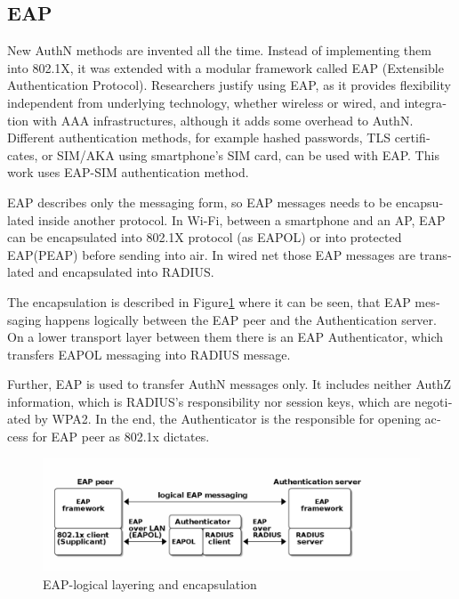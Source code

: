 \documentclass[12pt,a4paper,english]{tutthesis}
\begin{document}
\begin{otherlanguage}{english}
\section{EAP}
\label{sec-2-4}

New AuthN methods are invented all the time.
Instead of implementing them into 802.1X, it was 
extended with a modular framework called 
 EAP (Extensible Authentication Protocol)\cite{rfc5247}. 
Researchers justify using EAP, as it
provides flexibility independent from underlying technology, whether
wireless or wired,  and integration with AAA infrastructures, although
it adds some overhead to AuthN\cite{pereniguez10}.
Different authentication methods, for example hashed passwords, TLS
 certificates, or SIM/AKA using smartphone's SIM card,  can
be used with EAP.
This work uses EAP-SIM authentication method.


EAP describes only the messaging form, so EAP messages needs to
be encapsulated inside another protocol.  In Wi-Fi, between a smartphone
and an AP, EAP can be encapsulated into 802.1X protocol (as EAPOL) or
into protected EAP(PEAP)\cite{peap} before sending
into air. In wired net those EAP messages are translated and encapsulated into RADIUS.

The encapsulation is described in Figure\ref{fig:eap-layers} where it can be
seen, that EAP messaging happens logically between the EAP peer and
the Authentication server. On a lower transport layer between them
there is an EAP Authenticator, which transfers EAPOL messaging into
RADIUS message.

Further, EAP is used to transfer AuthN messages only.
It includes neither AuthZ information, which is RADIUS's
responsibility nor session keys, which are negotiated by WPA2.  In the
end,
the Authenticator is the responsible for opening access for EAP peer as 802.1x
dictates.







\begin{figure}[htb]
\centering
\includegraphics[width=.9\linewidth]{eap-layer.png}
\caption{\label{fig:eap-layers}EAP-logical layering and encapsulation}
\end{figure}




\end{otherlanguage}
\end{document}
